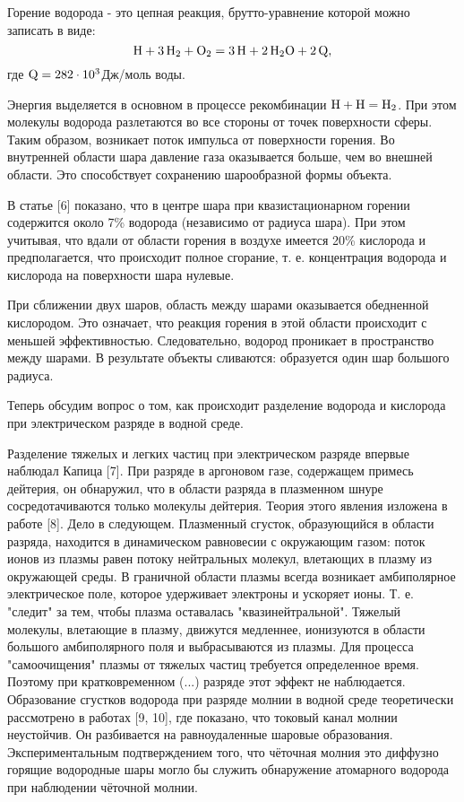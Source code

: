 \documentclass[a4paper]{article}
\begin{document}
\newpage
Горение водорода - это цепная реакция, брутто-уравнение которой можно записать в виде:
\begin{equation} \label{eq:1}
\ce{H} + \ce{3H2} + \ce{O2} = \ce{3H} + \ce{2H2O} + \ce{2Q},    
\end{equation}
где \(\ce{Q} = 282\cdot10^3\)Дж/моль воды.

Энергия выделяется в основном в процессе рекомбинации \(\ce{H} + \ce{H} = \ce{H2}\). При этом молекулы водорода разлетаются во все стороны от точек поверхности сферы. Таким образом, возникает поток импульса от поверхности горения. Во внутренней области шара давление газа оказывается больше, чем во внешней области. Это способствует сохранению шарообразной формы объекта. 

В статье [6] показано, что в центре шара при квазистационарном горении содержится около 7\% водорода (независимо от радиуса шара). При этом учитывая, что вдали от области горения в воздухе имеется 20\% кислорода и предполагается, что происходит полное сгорание, т. е. концентрация водорода и кислорода на поверхности шара нулевые.

При сближении двух шаров, область между шарами оказывается обедненной кислородом. Это означает, что реакция горения в этой области происходит с меньшей эффективностью. Следовательно, водород проникает в пространство между шарами. В результате объекты сливаются: образуется один шар большого радиуса.


Теперь обсудим вопрос о том, как происходит разделение водорода и кислорода при электрическом разряде в водной среде.

Разделение тяжелых и легких частиц при электрическом разряде впервые наблюдал Капица [7]. При разряде в аргоновом газе, содержащем примесь дейтерия, он обнаружил, что в области разряда в плазменном шнуре сосредотачиваются только молекулы дейтерия. Теория этого явления изложена в работе [8]. Дело в следующем. Плазменный сгусток, образующийся в области разряда, находится в динамическом равновесии с окружающим газом: поток ионов из плазмы равен потоку нейтральных молекул, влетающих в плазму из окружающей среды. В граничной области плазмы всегда возникает амбиполярное электрическое поле, которое удерживает электроны и ускоряет ионы. Т. е. "следит" за тем, чтобы плазма оставалась "квазинейтральной". Тяжелый молекулы, влетающие в плазму, движутся медленнее, ионизуются в области большого амбиполярного поля и выбрасываются из плазмы. Для процесса "самоочищения" плазмы от тяжелых частиц требуется определенное время. Поэтому при кратковременном (...) разряде этот эффект не наблюдается. Образование сгустков водорода при разряде молнии в водной среде теоретически рассмотрено в работах [9, 10], где показано, что токовый канал молнии неустойчив. Он разбивается на равноудаленные шаровые образования. Экспериментальным подтверждением того, что чёточная молния это диффузно горящие водородные шары могло бы служить обнаружение атомарного водорода при наблюдении чёточной молнии.
\end{document}
